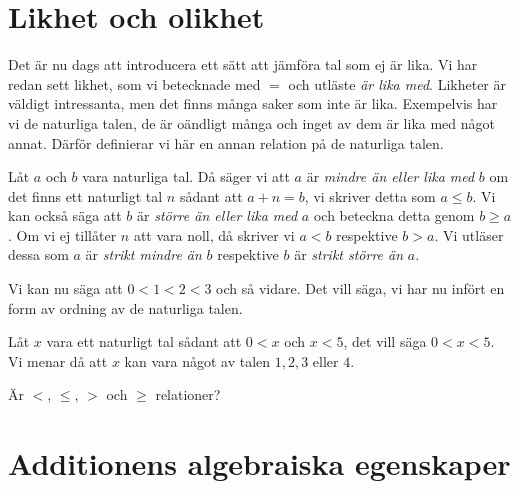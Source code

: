 \section{Likhet och olikhet}
Det är nu dags att introducera ett sätt att jämföra tal som ej är
lika.
Vi har redan sett likhet, som vi betecknade med \(=\) och utläste \emph{är lika
med}.
Likheter är väldigt intressanta, men det finns många saker som inte är lika.
Exempelvis har vi de naturliga talen, de är oändligt många och inget av dem är
lika med något annat.
Därför definierar vi här en annan relation på de naturliga talen.

\begin{definition}[Olikhet]\index{<}\index{\(\leq\)}\index{>}\index{\(\geq\)}
  Låt \(a\) och \(b\) vara naturliga tal.
  Då säger vi att \(a\) är \emph{mindre än eller lika med} \(b\) om det finns
  ett naturligt tal \(n\) sådant att \(a+n=b\), vi skriver detta som
  \(a\leq b\).
  Vi kan också säga att \(b\) är \emph{större än eller lika med} \(a\) och
  beteckna detta genom \(b\geq a\).
  Om vi ej tillåter \(n\) att vara noll, då skriver vi \(a<b\)
  respektive \(b>a\).
  Vi utläser dessa som \(a\) är \emph{strikt mindre än} \(b\)
  respektive \(b\) är \emph{strikt större än} \(a\).
\end{definition}

\begin{example}
  Vi kan nu säga att \(0<1<2<3\) och så vidare.
  Det vill säga, vi har nu infört en form av ordning av de naturliga talen.
\end{example}

\begin{example}
  Låt \(x\) vara ett naturligt tal sådant att \(0<x\) och \(x<5\), det vill
  säga \(0<x<5\).
  Vi menar då att \(x\) kan vara något av talen \(1,2,3\) eller \(4\).
\end{example}

\begin{exercise}
  Är \(<\), \(\leq\), \(>\) och \(\geq\) relationer?
\end{exercise}


\section{Additionens algebraiska egenskaper}


